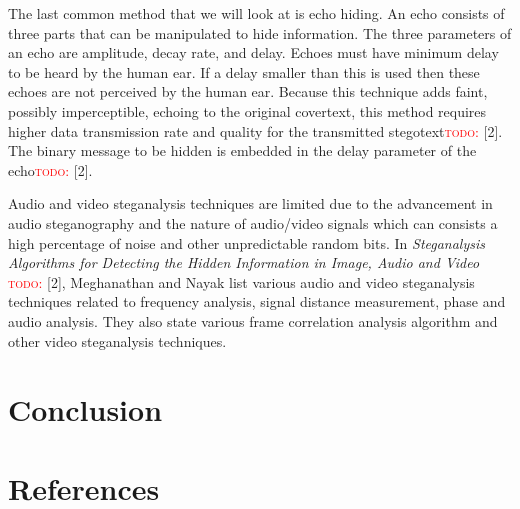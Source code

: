 \documentclass[11pt]{article}
\newcommand\todo[1]{\textcolor{red}{\textsc{todo}: #1}}
\begin{document}
The last common method that we will look at is echo hiding. An echo
consists of three parts that can be manipulated to hide information.
The three parameters of an echo are amplitude, decay rate, and delay.
Echoes must have minimum delay to be heard by the human ear. If a
delay smaller than this is used then these echoes are not perceived by
the human ear. Because this technique adds faint, possibly
imperceptible, echoing to the original covertext, this method requires
higher data transmission rate and quality for the transmitted
stegotext\todo{}[2]. The binary message to be hidden is embedded in the delay
parameter of the echo\todo{}[2].

Audio and video steganalysis techniques are limited due to the
advancement in audio steganography and the nature of audio/video
signals which can consists a high percentage of noise and other
unpredictable random bits. In \emph{Steganalysis Algorithms for Detecting
the Hidden Information in Image, Audio and Video} \todo{} [2], Meghanathan and
Nayak list various audio and video steganalysis techniques related to
frequency analysis, signal distance measurement, phase and audio
analysis. They also state various frame correlation analysis algorithm
and other video steganalysis techniques.

\section{Conclusion}
\section{References}
\end{document}

